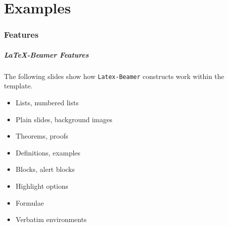 %
\part{Examples}
\makepart
\section{Features}
\begin{frame}
        \frametitle{\LaTeX{}-Beamer Features}
        The following slides show how {\tt Latex-Beamer} constructs work within the
        template.
        \begin{itemize}
      \item Lists, numbered lists
      \item Plain slides, background images
      \item Theorems, proofs
      \item Definitions, examples
      \item Blocks, alert blocks
      \item Highlight options
      \item Formulae
      \item Verbatim environments
    \end{itemize}
\end{frame}

